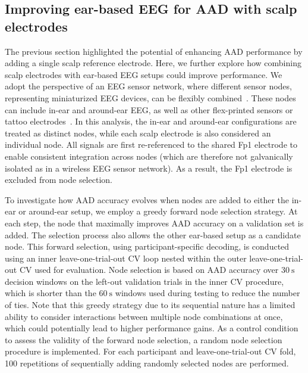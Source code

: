 \documentclass[fleqn,10pt]{wlscirep}
\begin{document}
	\subsection*{Improving ear-based EEG for AAD with scalp electrodes}
	The previous section highlighted the potential of enhancing AAD performance by adding a single scalp reference electrode. Here, we further explore how combining scalp electrodes with ear-based EEG setups could improve performance. We adopt the perspective of an EEG sensor network, where different sensor nodes, representing miniaturized EEG devices, can be flexibly combined~\cite{narayanan2020analysis,narayanan2021eeg}. These nodes can include in-ear and around-ear EEG, as well as other flex-printed sensors or tattoo electrodes~\cite{casson2019wearable}. In this analysis, the in-ear and around-ear configurations are treated as distinct nodes, while each scalp electrode is also considered an individual node. All signals are first re-referenced to the shared Fp1 electrode to enable consistent integration across nodes (which are therefore not galvanically isolated as in a wireless EEG sensor network). As a result, the Fp1 electrode is excluded from node selection.
	
	To investigate how AAD accuracy evolves when nodes are added to either the in-ear or around-ear setup, we employ a greedy forward node selection strategy. At each step, the node that maximally improves AAD accuracy on a validation set is added. The selection process also allows the other ear-based setup as a candidate node. This forward selection, using participant-specific decoding, is conducted using an inner leave-one-trial-out CV loop nested within the outer leave-one-trial-out CV used for evaluation. Node selection is based on AAD accuracy over $\SI{30}{\second}$ decision windows on the left-out validation trials in the inner CV procedure, which is shorter than the $\SI{60}{\second}$ windows used during testing to reduce the number of ties. Note that this greedy strategy due to its sequential nature has a limited ability to consider interactions between multiple node combinations at once, which could potentially lead to higher performance gains. As a control condition to assess the validity of the forward node selection, a random node selection procedure is implemented. For each participant and leave-one-trial-out CV fold, 100 repetitions of sequentially adding randomly selected nodes are performed.
	
\end{document}
